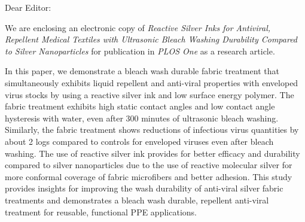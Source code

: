 \documentclass[11pt]{letter}
\date{\today}
\begin{document}
\begin{letter}{}


\opening{Dear Editor:}
 We are enclosing an electronic copy of \textit{Reactive Silver Inks for Antiviral, Repellent Medical Textiles with Ultrasonic Bleach Washing Durability Compared to Silver Nanoparticles}
for publication in %
\textit{PLOS One} as a research article.


In this paper, we demonstrate a bleach wash durable 
fabric treatment that simultaneously exhibits liquid repellent and anti-viral properties with enveloped virus stocks by using a reactive silver ink and low surface energy polymer. %
The fabric treatment 
exhibits high static contact angles and low contact angle hysteresis with water, even after 300 minutes of ultrasonic bleach washing. Similarly, the fabric treatment shows reductions of infectious virus quantities by about 2 logs compared to controls for enveloped viruses even after bleach washing. The use of reactive silver ink provides for 
better efficacy and durability compared to silver nanoparticles due to the use of reactive molecular silver for more conformal coverage of fabric microfibers and better adhesion.  This study provides insights for improving the wash durability of anti-viral silver fabric treatments and demonstrates a bleach wash durable, repellent anti-viral treatment for reusable, functional PPE applications. 


\end{letter}
\end{document}
